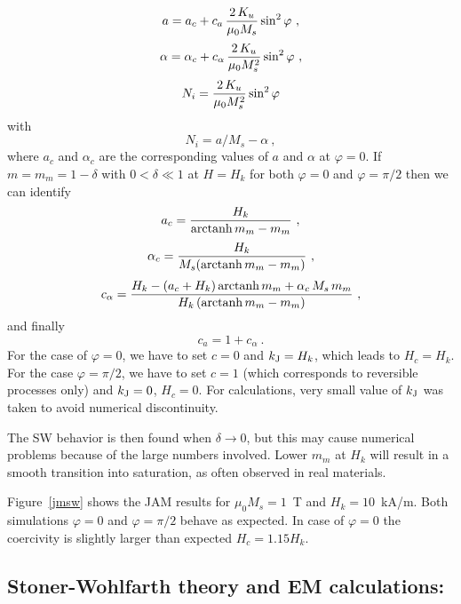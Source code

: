 \documentclass[../main.tex]{subfiles}
\begin{document}
\begin{equation}
  a = a_c+c_a\,{2\,K_u\over \mu_0 M_s} \sin^2\varphi \ ,
\end{equation}
\begin{equation}
  \alpha = \alpha_c+c_\alpha\,{2\,K_u\over \mu_0 M_s^2} \sin^2\varphi \ ,
\end{equation}
\begin{equation}
  N_i = {2\,K_u\over \mu_0 M_s^2} \sin^2\varphi
\end{equation}
with
\begin{equation}
  N_i=a/M_s-\alpha \ ,
\end{equation}
where $a_c$ and $\alpha_c$ are the corresponding values of $a$ and $\alpha$ at $\varphi=0$.
 If $m=m_m=1-\delta$ with $0<\delta \ll 1$ at $H=H_k$ for both
$\varphi=0$ and $\varphi=\pi/2$ then we can identify \cite{TMAG}
\begin{equation}
  a_c={H_k\over {\rm arctanh}{\,m_m}-m_m} \ ,
\end{equation}
\begin{equation}
  \alpha_c={H_k\over M_s ({\rm arctanh}{\,m_m}-m_m)} \ ,
\end{equation}
\begin{equation}
  c_\alpha = {H_k - (a_c+H_k)\,{\rm arctanh}{\,m_m} + \alpha_c\,M_s\,m_m\over
              H_k\,({\rm arctanh}{\,m_m} - m_m)} \ ,
\end{equation}
and finally
\begin{equation}
  c_a=1+c_\alpha \ .
\end{equation}
For the case of $\varphi=0$, we have to set $c=0$ and $k_{\rm J}=H_k$, 
which leads to $H_c=H_k$.
For the case $\varphi=\pi/2$, we have to set $c=1$
(which corresponds to reversible processes only) and $k_{\rm J}=0$,
$H_c=0$. For calculations, very small value of $k_{\rm J}$ was taken to avoid
numerical discontinuity.

The SW behavior is then found when $\delta\to 0$, but this may cause numerical
problems because of the large numbers involved. Lower $m_m$ at $H_k$ will result
in a smooth transition into saturation, as often observed in real materials.

Figure~\ref{jmsw} shows the JAM results for $\mu_0M_s=1$~T and $H_k=10$~kA/m.
Both simulations $\varphi=0$ and $\varphi=\pi/2$ behave as expected. 
In case of $\varphi=0$ the coercivity is slightly larger than expected $H_c=1.15 H_k$.

\subsection{Stoner-Wohlfarth theory and EM calculations:}
\end{document}
